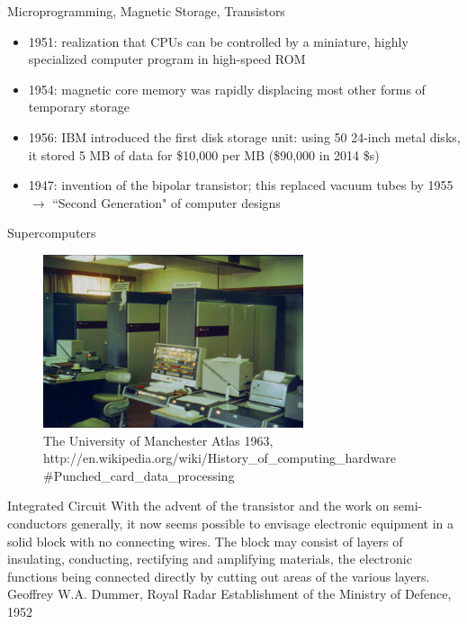\documentclass[xcolor=x11names,compress]{beamer}
\renewcommand{\(}{\begin{columns}}
\renewcommand{\)}{\end{columns}}
\newcommand{\<}[1]{\begin{column}{#1}}
\renewcommand{\>}{\end{column}}
\begin{document}
\begin{frame}{Microprogramming, Magnetic Storage, Transistors}
\begin{itemize}
\item 1951: realization that CPUs can be controlled by a miniature, highly specialized computer program in high-speed ROM \vspace*{0.5 em}
\item 1954: magnetic core memory was rapidly displacing most other forms of temporary storage \vspace*{0.5 em}
\item 1956: IBM introduced the first disk storage unit: using 50 24-inch metal disks, it stored 5 MB of data for \$10,000 per MB (\$90,000 in 2014 \$s)\vspace*{0.5 em}
\item 1947: invention of the bipolar transistor; this replaced vacuum tubes by 1955 $\rightarrow$ ``Second Generation" of computer designs
\end{itemize}
\end{frame}

\begin{frame}{Supercomputers}

\begin{figure}
\includegraphics[height=2in,clip]{Atlas1963}
\caption{The University of Manchester Atlas 1963, http://en.wikipedia.org/wiki/History\_of\_computing\_hardware
\#Punched\_card\_data\_processing}
\end{figure}

\end{frame}

\begin{frame}{Integrated Circuit}
With the advent of the \alert{transistor} and the work on semi-conductors generally, it now seems possible to envisage electronic equipment in a solid block with no connecting wires. The block may consist of layers of insulating, conducting, rectifying and amplifying materials, the \alert{electronic functions being connected directly} by cutting out areas of the various layers.\\
\vspace*{1.5 em}
\hspace*{0.5 in}Geoffrey W.A. Dummer, Royal Radar Establishment of the Ministry of Defence, 1952

\end{frame}
\end{document}
